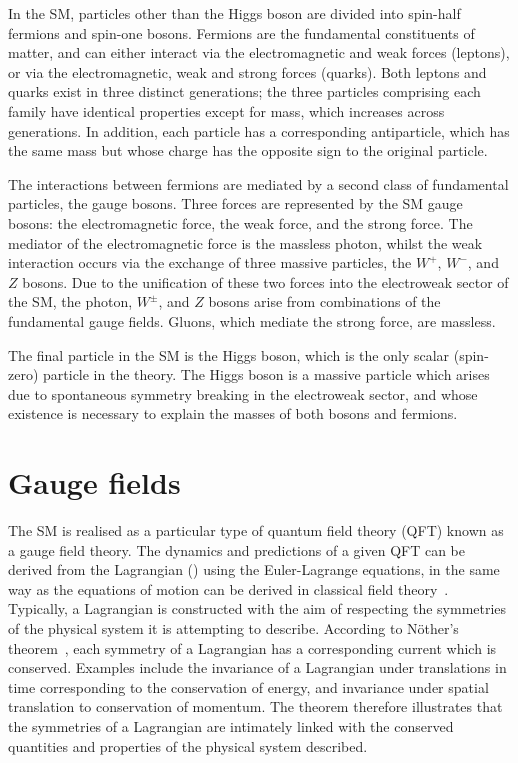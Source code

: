 In the SM, particles other than the Higgs boson are divided into spin-half fermions
and spin-one bosons.
Fermions are the fundamental constituents of matter, 
and can either interact via the electromagnetic and weak forces (leptons), 
or via the electromagnetic, weak and strong forces (quarks).
Both leptons and quarks exist in three distinct generations;
the three particles comprising each family have identical properties 
except for mass, which increases across generations.
In addition, each particle has a corresponding antiparticle, 
which has the same mass but whose charge has the opposite sign to the original particle.

The interactions between fermions are mediated by a second class of fundamental particles, 
the gauge bosons.
Three forces are represented by the SM gauge bosons: 
the electromagnetic force, the weak force, and the strong force.
The mediator of the electromagnetic force is the massless photon, 
whilst the weak interaction occurs via the exchange of three massive particles, 
the $W^+$, $W^-$, and $Z$ bosons.
Due to the unification of these two forces into the electroweak sector of the SM, 
the photon, $W^\pm$, and $Z$ bosons arise from combinations of the fundamental gauge fields.
Gluons, which mediate the strong force, 
are massless.

The final particle in the SM is the Higgs boson, 
which is the only scalar (spin-zero) particle in the theory.
The Higgs boson is a massive particle which arises 
due to spontaneous symmetry breaking in the electroweak sector, 
and whose existence is necessary to explain the masses of both bosons and fermions.

\section{Gauge fields}
\label{sec:theory_gauges}

The SM is realised as a particular type of quantum field theory (QFT) known as a gauge field theory.
The dynamics and predictions of a given QFT can be derived from the Lagrangian (\Like)
using the Euler-Lagrange equations, 
in the same way as the equations of motion can be derived in classical field theory~\cite{Peskin}.
Typically, a Lagrangian is constructed with the aim of respecting the symmetries 
of the physical system it is attempting to describe.
According to N\"other's theorem~\cite{Nother}, 
each symmetry of a Lagrangian has a corresponding current which is conserved.
Examples include the invariance of a Lagrangian under translations in time 
corresponding to the conservation of energy, 
and invariance under spatial translation to conservation of momentum.
The theorem therefore illustrates that the symmetries of a Lagrangian 
are intimately linked with the conserved quantities and properties of the physical system described.

